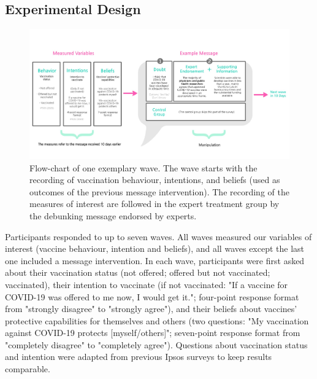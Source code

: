 \documentclass[authordate, empirical]{jote-new-article}
\begin{document}
	

	

	\subsection{Experimental Design}

	\begin{figure}[b]
		\begin{fullwidth}
		\includegraphics[width=\linewidth]{media/image1.jpg}

		\caption{Flow-chart of one exemplary wave. The wave starts with the recording of vaccination behaviour, intentions, and beliefs (used as outcomes of the previous message intervention). The recording of the measures of interest are followed in the expert treatment group by the debunking message endorsed by experts.}

		\label{fig:rId9}

		\end{fullwidth}
	\end{figure}

	Participants responded to up to seven waves. All waves measured our variables of interest (vaccine behaviour, intention and beliefs), and all waves except the last one included a message intervention. In each wave, participants were first asked about their vaccination status (not offered; offered but not vaccinated; vaccinated), their intention to vaccinate (if not vaccinated: "If a vaccine for COVID-19 was offered to me now, I would get it."; four-point response format from "strongly disagree" to "strongly agree"), and their beliefs about vaccines' protective capabilities for themselves and others (two questions: "My vaccination against COVID-19 protects [myself/others]"; seven-point response format from "completely disagree" to "completely agree"). Questions about vaccination status and intention were adapted from previous Ipsos surveys \parencites{Boyon2021} to keep results comparable.
\end{document}
